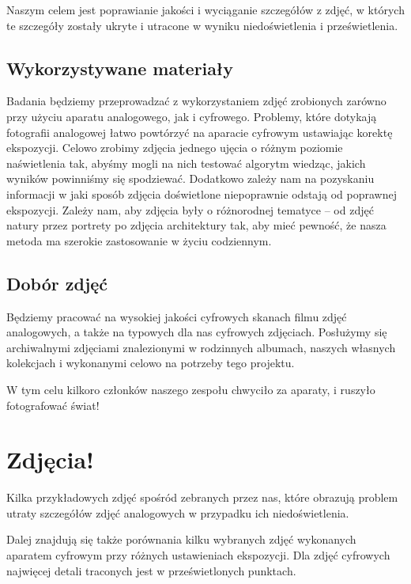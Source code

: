 \documentclass[]{mwart}
\begin{document}
Naszym celem jest poprawianie jakości i wyciąganie szczegółów
z zdjęć, w których te szczegóły zostały ukryte i utracone w wyniku
niedoświetlenia i prześwietlenia.

\subsection{Wykorzystywane materiały}
Badania będziemy przeprowadzać z wykorzystaniem zdjęć zrobionych
zarówno przy użyciu aparatu analogowego, jak i cyfrowego. Problemy,
które dotykają fotografii analogowej łatwo powtórzyć na aparacie cyfrowym
ustawiając korektę ekspozycji.
Celowo zrobimy zdjęcia jednego ujęcia o różnym poziomie naświetlenia tak,
abyśmy mogli na nich testować algorytm wiedząc, jakich wyników powinniśmy
się spodziewać. Dodatkowo zależy nam na pozyskaniu informacji w jaki sposób zdjęcia doświetlone niepoprawnie odstają od poprawnej ekspozycji.
Zależy nam, aby zdjęcia były o różnorodnej tematyce -- od zdjęć
natury przez portrety po zdjęcia architektury tak, aby mieć pewność, że nasza
metoda ma szerokie zastosowanie w życiu codziennym.


\subsection{Dobór zdjęć}
Będziemy pracować na wysokiej jakości cyfrowych skanach filmu zdjęć
analogowych, a także na typowych dla nas cyfrowych zdjęciach.
Posłużymy się archiwalnymi zdjęciami znalezionymi w
rodzinnych albumach, naszych własnych kolekcjach i wykonanymi
celowo na potrzeby tego projektu.

W tym celu kilkoro członków naszego zespołu chwyciło
za aparaty, i ruszyło fotografować świat!

\newpage
\section{Zdjęcia!}
Kilka przykładowych zdjęć spośród zebranych przez nas, które obrazują problem
utraty szczegółów zdjęć analogowych w przypadku ich niedoświetlenia. \newline

Dalej znajdują się także porównania kilku wybranych zdjęć wykonanych
aparatem cyfrowym przy różnych ustawieniach ekspozycji. Dla zdjęć
cyfrowych najwięcej detali traconych jest w prześwietlonych punktach. \vfill
\end{document}
